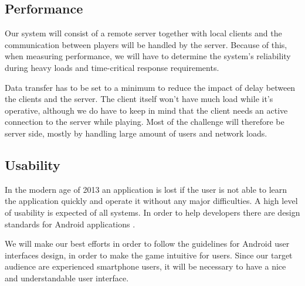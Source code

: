 \subsection{Performance}
Our system will consist of a remote server together with local clients and the communication between players will be handled by the server. Because of this, when measuring performance, we will have to determine the system's reliability during heavy loads and time-critical response requirements.

Data transfer has to be set to a minimum to reduce the impact of delay between
the clients and the server. The client itself won't have much load while it's
operative, although we do have to keep in mind that the client needs an
active connection to the server while playing. Most of the challenge will
therefore be server side, mostly by handling large amount of users and network
loads.

\subsection{Usability} 
In the modern age of 2013 an application is lost if the user is not able to learn the application quickly and operate it without any major difficulties. A high level of usability is expected of all systems. In order to help developers there are design standards for Android applications \cite{android}.

We will make our best efforts in order to follow the guidelines for Android user interfaces design, in order to make the game intuitive for users. Since our target audience are experienced smartphone users, it will be necessary to have a nice and understandable user interface.
